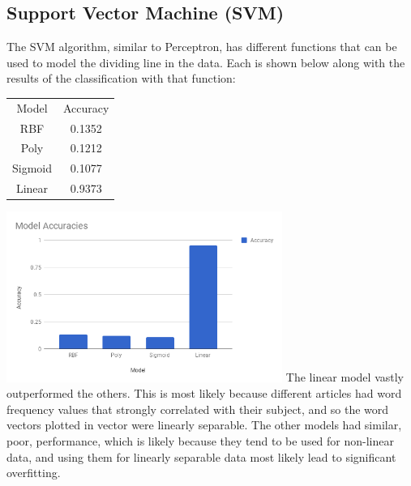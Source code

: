 \documentclass{article}
\begin{document}
        \subsection{Support Vector Machine (SVM)}
        The SVM algorithm, similar to Perceptron, has different functions that can be used to 
        model the dividing line in the data. Each is shown below along with the results of the 
        classification with that function:
        \begin{center}
            \begin{tabular}{|cc|}
                \hline
                Model   & Accuracy\\
                RBF     & 0.1352\\
                Poly    & 0.1212\\
                Sigmoid & 0.1077\\
                Linear  & 0.9373\\
                \hline
            \end{tabular}
        \end{center}
        \includegraphics[width=9cm]{graphs/SVM_comparison}
        The linear model vastly outperformed the others. This is most likely because different 
        articles had word frequency values that strongly correlated with their subject, and so 
        the word vectors plotted in vector were linearly separable. The other models had 
        similar, poor, performance, which is likely because they tend to be used for 
        non-linear data, and using them for linearly separable data most likely lead to 
        significant overfitting.
\end{document}
